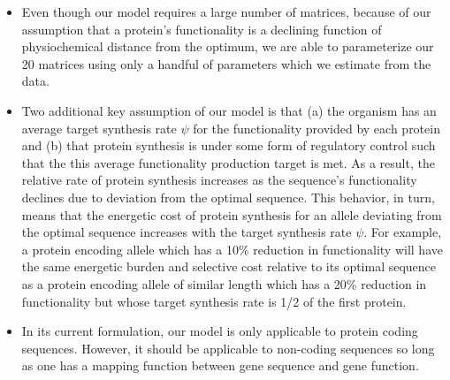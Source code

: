 \documentclass{article}
\begin{document}
\begin{itemize}
\item Even though our model requires a large number of matrices, because of our assumption that a protein's functionality is a declining function of physiochemical distance from the optimum, we are able to parameterize our 20 matrices using only a handful of parameters which we estimate from the data.
\item Two additional key assumption of our model is that (a) the organism has an average target synthesis rate $\psi$ for the functionality provided by each protein and (b) that protein synthesis is under some form of  regulatory control such that the this average functionality production target is met.
As a result, the relative rate of protein synthesis increases as the sequence's functionality declines due to deviation from the optimal sequence.
This behavior, in turn, means that the energetic cost of protein synthesis for an allele deviating from the optimal sequence increases with the target synthesis rate $\psi$.
For example, a protein encoding allele which has a 10\% reduction in functionality will have the same energetic burden and selective cost relative to its optimal sequence as a protein encoding allele of similar length which has a 20\% reduction in functionality but whose target synthesis rate is 1/2 of the first protein.
\item In its current formulation, our model is only applicable to protein coding sequences.
However, it should be applicable to non-coding sequences so long as one has a mapping function between gene sequence and gene function.

\end{itemize}
\end{document}
